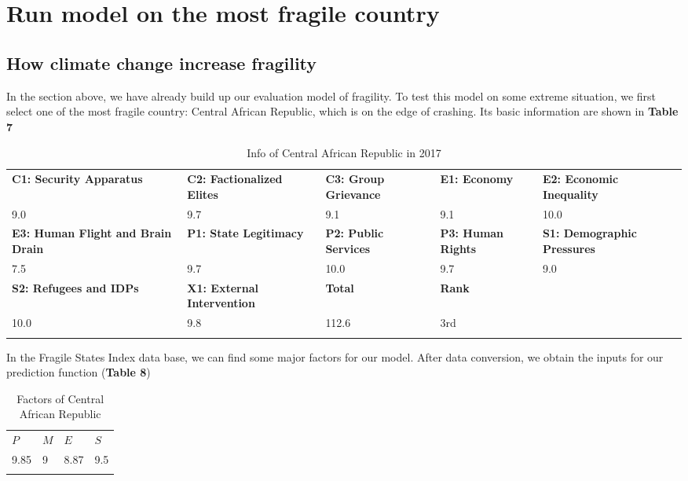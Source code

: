 \documentclass{mcmthesis}
\newlength\savedwidth
\newcommand\whline{\noalign{\global\savedwidth\arrayrulewidth
		\global\arrayrulewidth 1.2pt}%
	\hline
	\noalign{\global\arrayrulewidth\savedwidth}}
\newlength\savewidth
\newcommand\shline{\noalign{\global\savewidth\arrayrulewidth
		\global\arrayrulewidth 1.2pt}%
	\hline
	\noalign{\global\arrayrulewidth\savewidth}}
\begin{document}
	\section{Run model on the most fragile country}
	\subsection{How climate change increase fragility}
	In the section above, we have already build up our evaluation model of fragility. To test this model on some extreme situation, we first select one of the most fragile country: Central African Republic, which is on the edge of crashing. Its basic information are shown in \textbf{Table 7}

	\begin{table}[htbp]
		\renewcommand\arraystretch{1.5}
		\footnotesize
		\centering
		\begin{tabular}{m{2.5cm}<{\centering}|m{2.5cm}<{\centering}|m{2.5cm}<{\centering}|m{2.5cm}<{\centering}|m{2.5cm}<{\centering}}
			\whline
			\textbf{C1: Security Apparatus}&\textbf{C2: Factionalized Elites}&\textbf{C3: Group Grievance}&\textbf{E1: Economy}&\textbf{E2: Economic Inequality} \\
			\whline
			9.0 & 9.7 & 9.1 & 9.1 & 10.0\\
			\whline
			\textbf{E3: Human Flight and Brain Drain}&\textbf{P1: State Legitimacy}&\textbf{P2: Public Services}&\textbf{P3: Human Rights}&\textbf{S1: Demographic Pressures} \\
			\whline
			7.5 & 9.7 & 10.0 & 9.7 & 9.0\\
			\whline
			\textbf{S2: Refugees and IDPs}&\textbf{X1: External Intervention}&\textbf{Total}& \textbf{Rank} & \\
			\whline
			10.0 & 9.8 & 112.6 & 3rd &\\
			\shline
		\end{tabular}
		\caption{Info of Central African Republic in 2017}\label{tab:Info of Central African Republic in 2017}
	\end{table}
	
	
	In the Fragile States Index data base, we can find some major factors for our model. After data conversion, we obtain the inputs for our prediction function (\textbf{Table 8})
	
	\begin{table}[htbp]
		\renewcommand\arraystretch{1.5}
		\footnotesize
		\centering
		\begin{tabular}{m{2.5cm}<{\centering}|m{2.5cm}<{\centering}|m{2.5cm}<{\centering}|m{2.5cm}<{\centering}}
			\whline
			\textbf{$P$}&\textbf{$M$}&\textbf{$E$}&\textbf{$S$}\\
			\whline
			9.85 & 9 & 8.87 & 9.5 \\
			\shline
		\end{tabular}
		\caption{Factors of Central African Republic}\label{tab:Factors of Central African Republic}
	\end{table}
	
\end{document}
